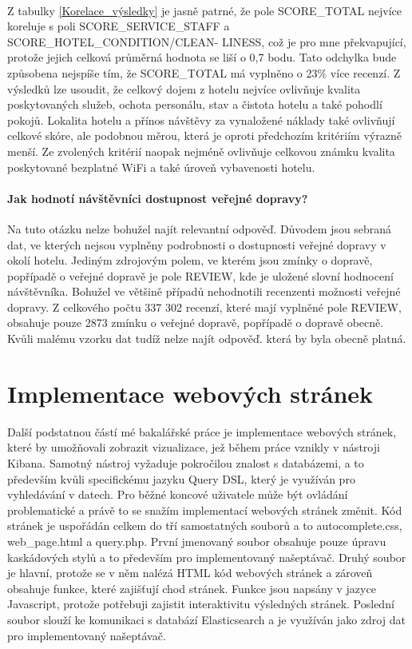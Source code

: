 \documentclass[czech,BP]{thesiskiv}
\begin{document}
 \\ \noindent
Z tabulky \ref{Korelace_výsledky} je jasně patrné, že pole SCORE\_TOTAL nejvíce koreluje s poli SCORE\_SERVICE\_STAFF a SCORE\_HOTEL\_CONDITION/CLEAN- LINESS, což je pro mne překvapující, protože jejich celková průměrná hodnota se liší o 0,7 bodu. Tato odchylka bude způsobena nejspíše tím, že SCORE\_TOTAL má vyplněno o 23\% více recenzí. Z výsledků lze usoudit, že celkový dojem z hotelu nejvíce ovlivňuje kvalita poskytovaných služeb, ochota personálu, stav a čistota hotelu a také pohodlí pokojů. Lokalita hotelu a přínos návštěvy za vynaložené náklady také ovlivňují celkové skóre, ale podobnou měrou, která je oproti předchozím kritériím výrazně menší. Ze zvolených kritérií naopak nejméně ovlivňuje celkovou známku kvalita poskytované bezplatné WiFi a také úroveň vybavenosti hotelu. 
\subsubsection{Jak hodnotí návštěvníci dostupnost veřejné dopravy?}
\label{doprava}
Na tuto otázku nelze  bohužel najít relevantní odpověď. Důvodem jsou sebraná dat, ve kterých nejsou vyplněny podrobnosti o dostupnosti veřejné dopravy v okolí hotelu. Jediným zdrojovým polem, ve kterém jsou zmínky o dopravě, popřípadě o veřejné dopravě je pole REVIEW, kde je uložené slovní hodnocení návštěvníka. Bohužel ve většině případů nehodnotili recenzenti možnosti veřejné dopravy. Z celkového počtu 337 302 recenzí, které mají vyplněné pole REVIEW, obsahuje pouze 2873 zmínku o veřejné dopravě, popřípadě o dopravě obecně. Kvůli malému vzorku dat tudíž nelze najít odpověď. která by byla obecně platná.

\chapter{Implementace webových stránek}
\label{chap:WEB}
Další podstatnou částí mé bakalářské práce je implementace webových stránek, které by umožňovali zobrazit vizualizace, jež během práce vznikly v nástroji Kibana. Samotný nástroj vyžaduje pokročilou znalost s databázemi, a to především kvůli specifickému jazyku Query DSL, který je využíván pro vyhledávání v datech. Pro běžné koncové uživatele může být ovládání problematické a právě to se snažím implementací webových stránek změnit. Kód stránek je uspořádán celkem do tří samostatných souborů a to autocomplete.css, web\_page.html a query.php. První jmenovaný soubor obsahuje pouze úpravu kaskádových stylů a to především pro implementovaný našeptávač. Druhý soubor je hlavní, protože se v něm nalézá HTML kód webových stránek a zároveň obsahuje funkce, které zajišťují chod stránek. Funkce jsou napsány v jazyce Javascript, protože potřebuji zajistit interaktivitu výsledných stránek. Poslední soubor slouží ke komunikaci s databází Elasticsearch a je využíván jako zdroj dat pro implementovaný našeptávač.
\end{document}
